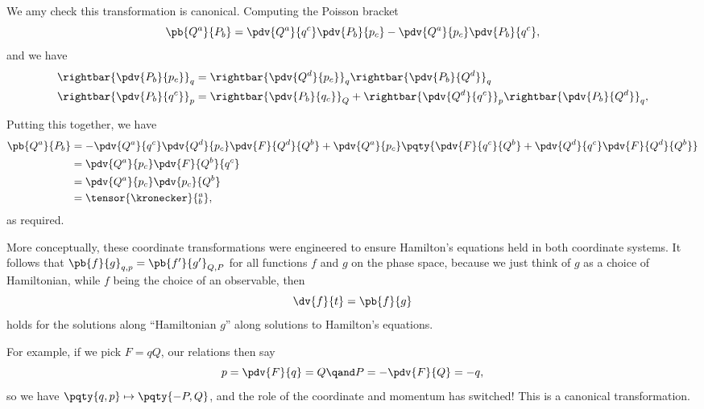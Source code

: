 We amy check this transformation is canonical. Computing the Poisson bracket
\begin{equation}
    \pb{Q^a}{P_b} = \pdv{Q^a}{q^c} \pdv{P_b}{p_c} - \pdv{Q^a}{p_c} \pdv{P_b}{q^c},
\end{equation}
and we have
\begin{subequations}
    \begin{align}
        \rightbar{\pdv{P_b}{p_c}}_q &= \rightbar{\pdv{Q^d}{p_c}}_q \rightbar{\pdv{P_b}{Q^d}}_q \\
        \rightbar{\pdv{P_b}{q^c}}_p &= \rightbar{\pdv{P_b}{q_c}}_Q + \rightbar{\pdv{Q^d}{q^c}}_p \rightbar{\pdv{P_b}{Q^d}}_q,
    \end{align}
\end{subequations}

Putting this together, we have
\begin{subequations}
    \begin{align}
        \pb{Q^a}{P_b} &= - \pdv{Q^a}{q^c} \pdv{Q^d}{p_c} \pdv{F}{Q^d}{Q^b} + \pdv{Q^a}{p_c} \pqty{\pdv{F}{q^c}{Q^b} + \pdv{Q^d}{q^c} \pdv{F}{Q^d}{Q^b}} \\
        &= \pdv{Q^a}{p_c} \pdv{F}{Q^b}{q^c} \\
        &= \pdv{Q^a}{p_c} \pdv{p_c}{Q^b} \\
        &= \tensor{\kronecker}{^a_b},
    \end{align}
\end{subequations}
as required.

More conceptually, these coordinate transformations were engineered to ensure Hamilton's equations held in both coordinate systems. It follows that \(\pb{f}{g}_{q, p} = \pb{f'}{g'}_{Q, P}\) for all functions \(f\) and \(g\) on the phase space, because we just think of \(g\) as a choice of Hamiltonian, while \(f\) being the choice of an observable, then
\begin{equation}
    \dv{f}{t} = \pb{f}{g}
\end{equation}
holds for the solutions along ``Hamiltonian \(g\)'' along solutions to Hamilton's equations.

For example, if we pick \(F = q Q\), our relations then say
\begin{equation}
    p = \pdv{F}{q} = Q \qand P = - \pdv{F}{Q} = - q,
\end{equation}
so we have \(\pqty{q, p} \mapsto \pqty{-P, Q}\), and the role of the coordinate and momentum has switched! This is a canonical transformation.

